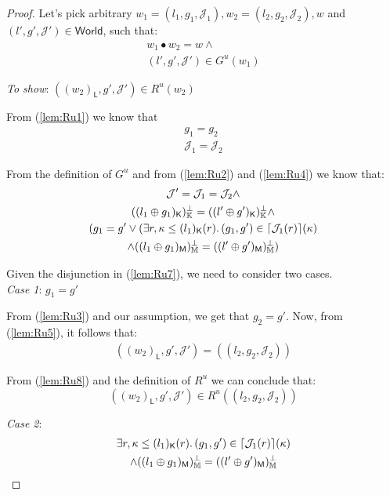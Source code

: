 {\parindent0pt
\begin{proof}
Let's pick arbitrary $w_1 = (l_1, g_1, \mathcal{J}_1), w_2 = (l_2, g_2, \mathcal{J}_2), w$ and $(l', g', \mathcal{J}') \in \mathsf{World}$, such that:
\begin{gather}
	\label{lem:Ru1} w_1 \bullet w_2 = w \land \\
	\label{lem:Ru2} (l', g', \mathcal{J}') \in G^u(w_1)
\end{gather}

\textit{To show}: $((w_2)_\mathsf{L}, g', \mathcal{J}') \in R^u(w_2)$

From (\ref{lem:Ru1}) we know that
\begin{gather}
	\label{lem:Ru3} g_1 = g_2 \\
	\label{lem:Ru4} \mathcal{J}_1 = \mathcal{J}_2
\end{gather}

From the definition of $G^u$ and from (\ref{lem:Ru2}) and (\ref{lem:Ru4}) we know that:
\begin{gather}
	\label{lem:Ru5} \mathcal{J}' = \mathcal{J}_1 = \mathcal{J}_2 \land \\
	\label{lem:Ru6} ((l_1 \oplus g_1)_\mathsf{K})_\mathbb{K}^\bot = ((l' \oplus g')_\mathsf{K})_\mathbb{K}^\bot \land \\
		\label{lem:Ru7} (g_1 = g' \lor (\exists r, \kappa \leq (l_1)_\mathsf{K}(r) \ldotp (g_1, g') \in \lceil \mathcal{J}_1(r) \rceil(\kappa)
		\\ \land ((l_1 \oplus g_1)_\mathsf{M})_\mathbb{M}^\bot = ((l' \oplus g')_\mathsf{M})_\mathbb{M}^\bot )
\end{gather}

Given the disjunction in (\ref{lem:Ru7}), we need to consider two cases. \\

\textit{Case 1}: $g_1 = g'$

From (\ref{lem:Ru3}) and our assumption, we get that $g_2 = g'$. Now, from (\ref{lem:Ru5}), it follows that:
\begin{gather}
	\label{lem:Ru8} ((w_2)_\mathsf{L}, g', \mathcal{J}') = ((l_2, g_2, \mathcal{J}_2))
\end{gather}

From (\ref{lem:Ru8}) and the definition of $R^u$ we can conclude that:
\[
	((w_2)_\mathsf{L}, g', \mathcal{J}') \in R^u((l_2, g_2, \mathcal{J}_2))
\]

\textit{Case 2}:
\begin{gather}
	\label{lem:Ru9} \exists r, \kappa \leq (l_1)_\mathsf{K}(r) \ldotp (g_1, g') \in \lceil \mathcal{J}_1(r) \rceil(\kappa)
	\\
	\label{lem:Ru10} \land ((l_1 \oplus g_1)_\mathsf{M})_\mathbb{M}^\bot = ((l' \oplus g')_\mathsf{M})_\mathbb{M}^\bot
\end{gather}


\end{proof}}
